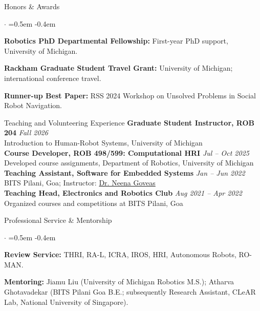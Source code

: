 \documentclass{resume}
\begin{document}
\begin{rSection}{Honors \& Awards}
\begin{list}{$\cdot$}{\leftmargin=0pt \itemindent=0pt \listparindent=0pt =0.5em \itemsep -0.4em}
\item {\bf Robotics PhD Departmental Fellowship:} First-year PhD support, University of Michigan.
\item {\bf Rackham Graduate Student Travel Grant:} University of Michigan; international conference travel.
\item {\bf Runner-up Best Paper:} RSS 2024 Workshop on Unsolved Problems in Social Robot Navigation.
\end{list}
\end{rSection}

\begin{rSection}{Teaching and Volunteering Experience}
{\bf Graduate Student Instructor, ROB 204} \hfill {\em Fall 2026}
\\ Introduction to Human-Robot Systems, University of Michigan
\\ {\bf Course Developer, ROB 498/599: Computational HRI} \hfill {\em Jul -- Oct 2025}
\\ Developed course assignments, Department of Robotics, University of Michigan
\\ {\bf Teaching Assistant, Software for Embedded Systems} \hfill {\em Jan -- Jun 2022}
\\ BITS Pilani, Goa; Instructor: \href{https://www.bits-pilani.ac.in/goa/neena-goveas/}{Dr. Neena Goveas}
\\ {\bf Teaching Head, Electronics and Robotics Club} \hfill {\em Aug 2021 -- Apr 2022}
\\ Organized courses and competitions at BITS Pilani, Goa
\end{rSection}

\begin{rSection}{Professional Service \& Mentorship}
\begin{list}{$\cdot$}{\leftmargin=0pt \itemindent=0pt \listparindent=0pt =0.5em \itemsep -0.4em}
\item {\bf Review Service:} THRI, RA-L, ICRA, IROS, HRI, Autonomous Robots, RO-MAN.
\item {\bf Mentoring:} Jiamu Liu (University of Michigan Robotics M.S.); Atharva Ghotavadekar (BITS Pilani Goa B.E.; subsequently Research Assistant, CLeAR Lab, National University of Singapore).
\end{list}
\end{rSection}
\end{document}
